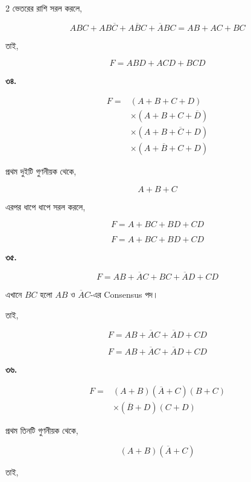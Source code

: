 \begin{multicols}{2}
ভেতরের রাশি সরল করলে,

\[
ABC+AB\overline C
+A\overline BC+\overline ABC
=
AB+AC+BC
\]

তাই,

\[
\boxed{F=ABD+ACD+BCD}
\]

\medskip


\textbf{৩৪.}

\[
\begin{aligned}
F
={}&(A+B+C+D)\\
&\times(A+B+C+\overline D)\\
&\times(A+B+\overline C+D)\\
&\times(A+\overline B+C+D)
\end{aligned}
\]

প্রথম দুইটি গুণনীয়ক থেকে,

\[
A+B+C
\]

এরপর ধাপে ধাপে সরল করলে,

\[
F=A+BC+BD+CD
\]

\[
\boxed{F=A+BC+BD+CD}
\]

\medskip


\textbf{৩৫.}

\[
F=AB+\overline AC+BC+\overline AD+CD
\]

এখানে \(BC\) হলো \(AB\) ও \(\overline AC\)-এর
\textenglish{Consensus} পদ।

তাই,

\[
F=AB+\overline AC+\overline AD+CD
\]

\[
\boxed{F=AB+\overline AC+\overline AD+CD}
\]

\medskip


\textbf{৩৬.}

\[
\begin{aligned}
F
={}&(A+B)(\overline A+C)(B+C)\\
&\times(\overline B+D)(C+D)
\end{aligned}
\]

প্রথম তিনটি গুণনীয়ক থেকে,

\[
(A+B)(\overline A+C)
\]

তাই,


\end{multicols}
